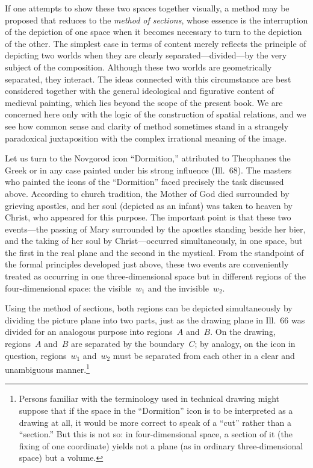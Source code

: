 If one attempts to show these two spaces together visually, a method may be proposed that
reduces to the \emph{method of sections}, whose essence is the interruption of the
depiction of one space when it becomes necessary to turn to the depiction of the other.
The simplest case in terms of content merely reflects the principle of depicting two
worlds when they are clearly separated---divided---by the very subject of the composition.
Although these two worlds are geometrically separated, they interact.  The ideas connected
with this circumstance are best considered together with the general ideological and
figurative content of medieval painting, which lies beyond the scope of the present book.
We are concerned here only with the logic of the construction of spatial relations, and
we see how common sense and clarity of method sometimes stand in a strangely paradoxical
juxtaposition with the complex irrational meaning of the image.


Let us turn to the Novgorod icon ``Dormition,'' attributed to Theophanes the Greek or in
any case painted under his strong influence (Ill.~68).  The masters who painted the icons
of the ``Dormition'' faced precisely the task discussed above.  According to church
tradition, the Mother of God died surrounded by grieving apostles, and her soul (depicted
as an infant) was taken to heaven by Christ, who appeared for this purpose.  The important
point is that these two events---the passing of Mary surrounded by the apostles standing
beside her bier, and the taking of her soul by Christ---occurred simultaneously, in one
space, but the first in the real plane and the second in the mystical.  From the standpoint
of the formal principles developed just above, these two events are conveniently treated
as occurring in one three-dimensional space but in different regions of the four-dimensional
space: the visible~$w_1$ and the invisible~$w_2$.

Using the method of sections, both regions can be depicted simultaneously by dividing the
picture plane into two parts, just as the drawing plane in Ill.~66 was divided for an
analogous purpose into regions~$A$ and~$B$.  On the drawing, regions~$A$ and~$B$ are
separated by the boundary~$C$; by analogy, on the icon in question, regions~$w_1$
and~$w_2$ must be separated from each other in a clear and unambiguous
manner.\footnote{Persons familiar with the terminology used in technical drawing might
  suppose that if the space in the ``Dormition'' icon is to be interpreted as a drawing
  at all, it would be more correct to speak of a ``cut'' rather than a ``section.''  But
  this is not so: in four-dimensional space, a section of it (the fixing of one
  coordinate) yields not a plane (as in ordinary three-dimensional space) but a volume.}

